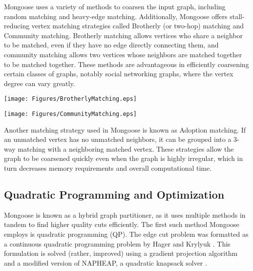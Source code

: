 \documentclass[letter]{article}
\begin{document}
Mongoose uses a variety of methods to coarsen the input graph, including random matching and heavy-edge matching. Additionally, Mongoose offers stall-reducing vertex matching strategies called Brotherly (or two-hop) matching and Community matching. Brotherly matching allows vertices who share a neighbor to be matched, even if they have no edge directly connecting them, and community matching allows two vertices whose neighbors are matched together to be matched together. These methods are advantageous in efficiently coarsening certain classes of graphs, notably social networking graphs, where the vertex degree can vary greatly.

\begin{center}
\begin{minipage}[c]{0.47\linewidth}
    \texttt{[image: Figures/BrotherlyMatching.eps]} 
\end{minipage}
\hspace{22pt}
\begin{minipage}[c]{0.47\linewidth}
    \texttt{[image: Figures/CommunityMatching.eps]} 
\end{minipage}
\end{center}

Another matching strategy used in Mongoose is known as Adoption matching. If an unmatched vertex has no unmatched neighbors, it can be grouped into a 3-way matching with a neighboring matched vertex. These strategies allow the graph to be coarsened quickly even when the graph is highly irregular, which in turn decreases memory requirements and overall computational time.

\subsection{Quadratic Programming and Optimization}

Mongoose is known as a hybrid graph partitioner, as it uses multiple methods in tandem to find higher quality cuts efficiently. The first such method Mongoose employs is quadratic programming (QP). The edge cut problem was formatted as a continuous quadratic programming problem by Hager and Krylyuk \cite{HagerKrylyuk1999}. This formulation is solved (rather, improved) using a gradient projection algorithm and a modified version of NAPHEAP, a quadratic knapsack solver \cite{DavisHagerHungerford2016}.
\\
\end{document}
